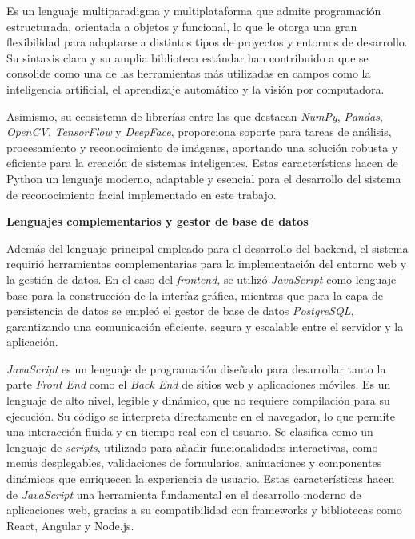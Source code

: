 Es un lenguaje multiparadigma y multiplataforma que admite programación estructurada, orientada a objetos y funcional, lo que le otorga una gran flexibilidad para adaptarse a distintos tipos de proyectos y entornos de desarrollo\cite{python_docs}. Su sintaxis clara y su amplia biblioteca estándar han contribuido a que se consolide como una de las herramientas más utilizadas en campos como la inteligencia artificial, el aprendizaje automático y la visión por computadora.  

Asimismo, su ecosistema de librerías entre las que destacan \textit{NumPy}, \textit{Pandas}, \textit{OpenCV}, \textit{TensorFlow} y \textit{DeepFace}, proporciona soporte para tareas de análisis, procesamiento y reconocimiento de imágenes, aportando una solución robusta y eficiente para la creación de sistemas inteligentes. Estas características hacen de Python un lenguaje moderno, adaptable y esencial para el desarrollo del sistema de reconocimiento facial implementado en este trabajo\cite{python}.

\textbf{Lenguajes complementarios y gestor de base de datos}

Además del lenguaje principal empleado para el desarrollo del backend, el sistema requirió herramientas complementarias para la implementación del entorno web y la gestión de datos.  
En el caso del \textit{frontend}, se utilizó \textit{JavaScript} como lenguaje base para la construcción de la interfaz gráfica, mientras que para la capa de persistencia de datos se empleó el gestor de base de datos \textit{PostgreSQL}, garantizando una comunicación eficiente, segura y escalable entre el servidor y la aplicación.

\textit{JavaScript} es un lenguaje de programación diseñado para desarrollar tanto la parte \textit{Front End} como el \textit{Back End} de sitios web y aplicaciones móviles. Es un lenguaje de alto nivel, legible y dinámico, que no requiere compilación para su ejecución. Su código se interpreta directamente en el navegador, lo que permite una interacción fluida y en tiempo real con el usuario.  
Se clasifica como un lenguaje de \textit{scripts}, utilizado para añadir funcionalidades interactivas, como menús desplegables, validaciones de formularios, animaciones y componentes dinámicos que enriquecen la experiencia de usuario.  
Estas características hacen de \textit{JavaScript} una herramienta fundamental en el desarrollo moderno de aplicaciones web, gracias a su compatibilidad con frameworks y bibliotecas como React, Angular y Node.js\cite{javascript}.

